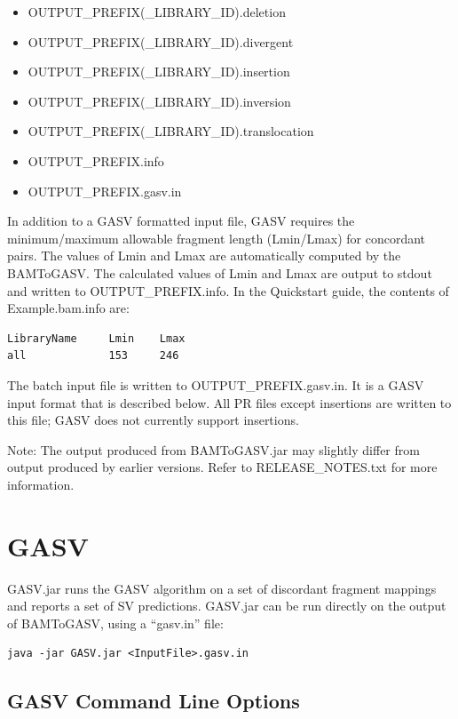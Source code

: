 \documentclass[11pt]{article}
\begin{document}
\begin{itemize}
\item[] OUTPUT\_PREFIX(\_LIBRARY\_ID).deletion
\item[] OUTPUT\_PREFIX(\_LIBRARY\_ID).divergent
\item[] OUTPUT\_PREFIX(\_LIBRARY\_ID).insertion
\item[] OUTPUT\_PREFIX(\_LIBRARY\_ID).inversion
\item[] OUTPUT\_PREFIX(\_LIBRARY\_ID).translocation
\item[] OUTPUT\_PREFIX.info
\item[] OUTPUT\_PREFIX.gasv.in
\end{itemize}

In addition to a GASV formatted input file, GASV requires the minimum/maximum
allowable fragment length (Lmin/Lmax) for concordant pairs. The values of Lmin
and Lmax are automatically computed by the BAMToGASV. The calculated values of Lmin and Lmax are output to stdout and written to OUTPUT\_PREFIX.info. In the Quickstart guide, the contents of Example.bam.info are:

{
\begin{Verbatim}[frame=single]
LibraryName     Lmin    Lmax
all             153     246
\end{Verbatim}
}

The batch input file is written to OUTPUT\_PREFIX.gasv.in.  It is a GASV input format that is described below.  All PR files except insertions are written to this file; GASV does not currently support insertions.

Note: The output produced from BAMToGASV.jar may slightly differ from output produced by earlier versions. Refer to RELEASE\_NOTES.txt for more information.

\clearpage
\section{GASV}

GASV.jar runs the GASV algorithm on a set of discordant fragment mappings and reports a set of SV predictions.  GASV.jar can be run directly on the output of BAMToGASV, using a ``gasv.in'' file:

\begin{Verbatim}[frame=single]
java -jar GASV.jar <InputFile>.gasv.in
\end{Verbatim}

\subsection{GASV Command Line Options}
\end{document}

